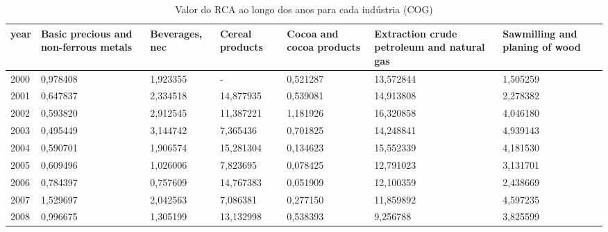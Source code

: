 \begin{table}
\centering
\caption{Valor do RCA ao longo dos anos para cada indústria (COG)}
\begin{tabular}{p{1cm}p{2cm}p{2cm}p{2cm}p{2cm}p{2cm}p{2cm}}
\toprule
 year &  Basic precious and non-ferrous metals &  Beverages, nec &  Cereal products &  Cocoa and cocoa products &  Extraction crude petroleum and natural gas &  Sawmilling and planing of wood \\
\midrule
 2000 &                               0,978408 &        1,923355 &                - &                  0,521287 &                                   13,572844 &                        1,505259 \\
 2001 &                               0,647837 &        2,334518 &        14,877935 &                  0,539081 &                                   14,913808 &                        2,278382 \\
 2002 &                               0,593820 &        2,912545 &        11,387221 &                  1,181926 &                                   16,320858 &                        4,046180 \\
 2003 &                               0,495449 &        3,144742 &         7,365436 &                  0,701825 &                                   14,248841 &                        4,939143 \\
 2004 &                               0,590701 &        1,906574 &        15,281304 &                  0,134623 &                                   15,552339 &                        4,181530 \\
 2005 &                               0,609496 &        1,026006 &         7,823695 &                  0,078425 &                                   12,791023 &                        3,131701 \\
 2006 &                               0,784397 &        0,757609 &        14,767383 &                  0,051909 &                                   12,100359 &                        2,438669 \\
 2007 &                               1,529697 &        2,042563 &         7,086381 &                  0,277150 &                                   11,859892 &                        4,597235 \\
 2008 &                               0,996675 &        1,305199 &        13,132998 &                  0,538393 &                                    9,256788 &                        3,825599 \\

\end{tabular}
\end{table}
